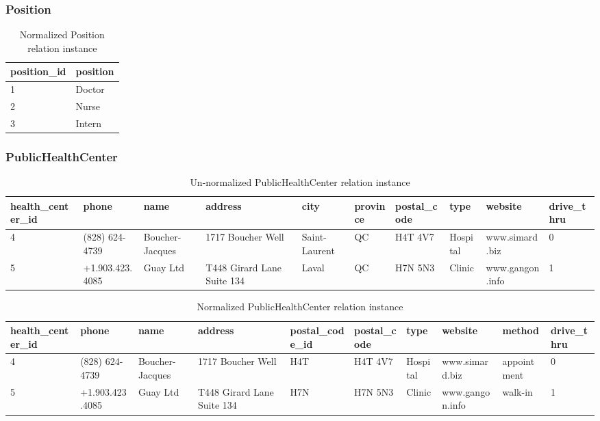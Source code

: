 \documentclass{article}
\begin{document}
\subsubsection{Position}
\begin{table}[H]
\centering
\begin{adjustbox}{width=0.2\textwidth,center=\textwidth}
\begin{tabular}{|l|l|} 
        \hline
        position\_id & position \\ 
        \hline
        1 & Doctor \\
        2 & Nurse \\
        3 & Intern \\
        \hline
\end{tabular}
\end{adjustbox}
\caption{Normalized Position relation instance}
\end{table}


\subsubsection{PublicHealthCenter}
\begin{table}[H]
\centering
\begin{adjustbox}{width=1.2\textwidth,center=\textwidth}
\begin{tabular}{|l|l|l|l|l|l|l|l|l|l|} 
        \hline
        health\_center\_id & phone & name & address & city & province & postal\_code & type & website & drive\_thru\\ 
        \hline
        4 & (828) 624-4739 & Boucher-Jacques & 1717 Boucher Well & Saint-Laurent & QC & H4T 4V7 & Hospital & www.simard.biz & 0\\
        5 & +1.903.423.4085 & Guay Ltd & T448 Girard Lane Suite 134 & Laval & QC & H7N 5N3 & Clinic & www.gangon.info & 1\\
        \hline
\end{tabular}
\end{adjustbox}
\caption{Un-normalized PublicHealthCenter relation instance}
\end{table}

\begin{table}[H]
\centering
\begin{adjustbox}{width=1.2\textwidth,center=\textwidth}
\begin{tabular}{|l|l|l|l|l|l|l|l|l|l|} 
        \hline
        health\_center\_id & phone & name & address & postal\_code\_id& postal\_code & type & website & method & drive\_thru\\ 
        \hline
        4 & (828) 624-4739 & Boucher-Jacques & 1717 Boucher Well & H4T & H4T 4V7 & Hospital & www.simard.biz & appointment & 0\\
        5 & +1.903.423.4085 & Guay Ltd & T448 Girard Lane Suite 134 & H7N & H7N 5N3 & Clinic & www.gangon.info & walk-in & 1\\
        \hline
\end{tabular}
\end{adjustbox}
\caption{Normalized PublicHealthCenter relation instance}
\end{table}
\end{document}
